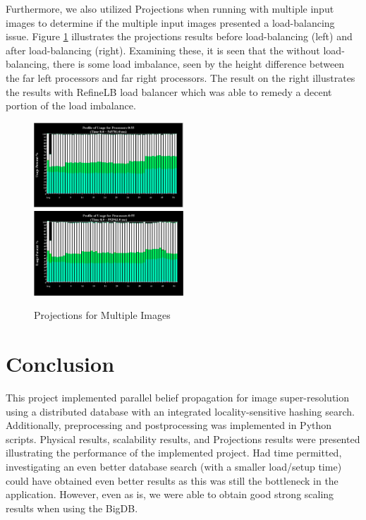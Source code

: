 \documentclass[a4paper]{article}
\begin{document}
Furthermore, we also utilized Projections when running with multiple input images to determine if the multiple input images presented a load-balancing issue.  Figure \ref{projections_multi} illustrates the projections results before load-balancing (left) and after load-balancing (right).  Examining these, it is seen that the without load-balancing, there is some load imbalance, seen by the height difference between the far left processors and far right processors.  The result on the right illustrates the results with RefineLB load balancer which was able to remedy a decent portion of the load imbalance.

\begin{figure}[ht!]
\centerline{%
\includegraphics[width=0.5\textwidth]{figs/multi_nobalance}%
\includegraphics[width=0.5\textwidth]{figs/multi_balance}%
}%
\caption{Projections for Multiple Images}
\label{projections_multi}
\end{figure}

\section{Conclusion}
This project implemented parallel belief propagation for image super-resolution using a distributed database with an integrated locality-sensitive hashing search.  Additionally, preprocessing and postprocessing was implemented in Python scripts.  Physical results, scalability results, and Projections results were presented illustrating the performance of the implemented project.  Had time permitted, investigating an even better database search (with a smaller load/setup time) could have obtained even better results as this was still the bottleneck in the application.  However, even as is, we were able to obtain good strong scaling results when using the BigDB.


\nocite*{}

\end{document}
